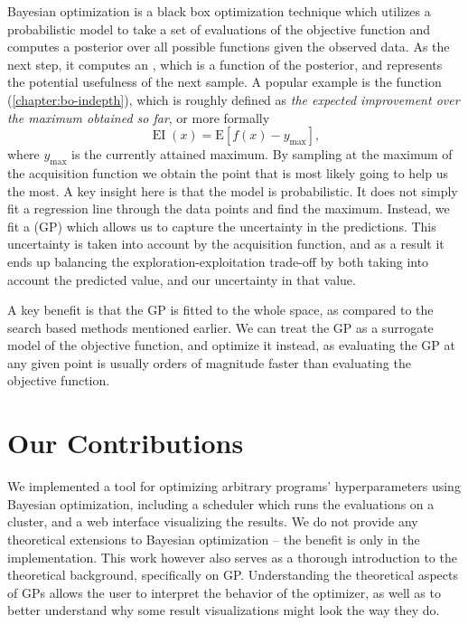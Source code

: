 Bayesian optimization \citep{nando-bayesian-out-of-the-loop} is a black box
optimization technique which utilizes a probabilistic model to take a set of
evaluations of the objective function and computes a posterior over all
possible functions given the observed data. As the next step, it computes an
, which is a function of the posterior, and
represents the potential usefulness of the next sample. A popular example is
the  function (\autoref{chapter:bo-indepth}), which is
roughly defined as \emph{the expected improvement over the maximum obtained so
far}, or more formally $$\operatorname{EI}(x) = \mathrm{E}\left[f(x) - y_{\max}\right],$$ where $y_{\max}$ is the currently attained maximum. By sampling at the maximum of the acquisition function we obtain the
point that is most likely going to help us the most. A key insight here is that
the model is probabilistic. It does not simply fit a regression line through
the data points and find the maximum.  Instead, we fit a  (GP) which allows us to capture the uncertainty in the
predictions. This uncertainty is taken into account by the acquisition
function, and as a result it ends up balancing the exploration-exploitation
trade-off by both taking into account the predicted value, and our uncertainty
in that value.

A key benefit is that the GP is fitted to the whole space, as compared to the search based methods mentioned earlier. We can treat the GP as a surrogate model of the objective function, and optimize it instead, as evaluating the GP at any given point is usually orders of magnitude faster than evaluating the objective function.






\section{Our Contributions}

We implemented a tool for optimizing arbitrary programs' hyperparameters using
Bayesian optimization, including a scheduler which runs the evaluations on a
cluster, and a web interface visualizing the results. We do not provide any
theoretical extensions to Bayesian optimization -- the benefit is only in the
implementation. This work however also serves as a thorough introduction to the
theoretical background, specifically on GP. Understanding the theoretical
aspects of GPs allows the user to interpret the behavior of the optimizer, as
well as to better understand why some result visualizations might look the way
they do.

